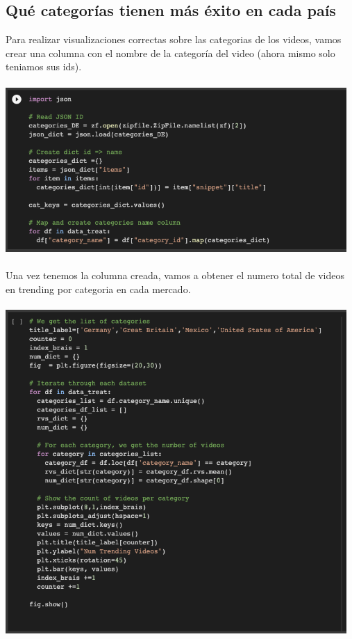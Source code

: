 \documentclass[a4paper,12pt]{article}
\begin{document}
\subsection{Qu\'e categor\'ias tienen m\'as \'exito en cada pa\'is}

Para realizar visualizaciones correctas sobre las categorias de los videos, vamos crear una columna con el nombre de la categor\'ia del video (ahora mismo solo teniamos sus ids).
\\
\\
\includegraphics[width=13cm]{categories_1.png}
\\
\\
Una vez tenemos la columna creada, vamos a obtener el numero total de videos en trending por categoria en cada mercado.
\\
\\
\includegraphics[width=13cm]{categories_2.png}
\end{document}
